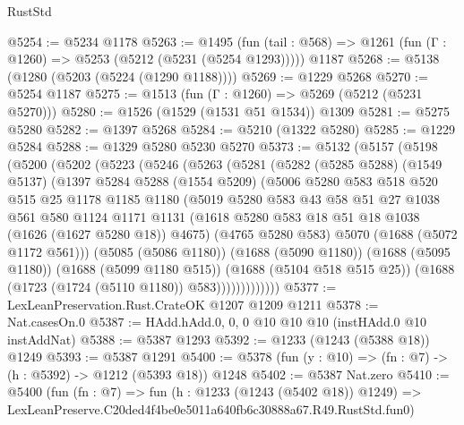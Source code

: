 \begin{lexlean}{RustStd}
\begin{coremodule}
@5254 := @5234 @1178
@5263 := @1495
    (fun (tail : @568) => @1261 (fun (Γ : @1260) => @5253 (@5212 (@5231 (@5254 @1293)))))
    @1187
@5268 := @5138 (@1280 (@5203 (@5224 (@1290 @1188))))
@5269 := @1229 @5268
@5270 := @5254 @1187
@5275 := @1513 (fun (Γ : @1260) => @5269 (@5212 (@5231 @5270)))
@5280 := @1526 (@1529 (@1531 @51 @1534)) @1309
@5281 := @5275 @5280
@5282 := @1397 @5268
@5284 := @5210 (@1322 @5280)
@5285 := @1229 @5284
@5288 := @1329 @5280 @5230 @5270
@5373 := @5132
    (@5157
      (@5198
        (@5200
          (@5202
            (@5223
              (@5246
                (@5263
                  (@5281
                    (@5282
                      (@5285 @5288)
                      (@1549 @5137)
                      (@1397
                        @5284
                        @5288
                        (@1554 @5209)
                        (@5006
                          @5280
                          @583
                          @518
                          @520
                          @515
                          @25
                          @1178
                          @1185
                          @1180
                          (@5019
                            @5280
                            @583
                            @43
                            @58
                            @51
                            @27
                            @1038
                            @561
                            @580
                            @1124
                            @1171
                            @1131
                            (@1618 @5280 @583 @18 @51 @18 @1038 (@1626 (@1627 @5280 @18)) @4675)
                            (@4765 @5280 @583)
                            @5070
                            (@1688 (@5072 @1172 @561)))
                          (@5085 (@5086 @1180))
                          (@1688 (@5090 @1180))
                          (@1688 (@5095 @1180))
                          (@1688 (@5099 @1180 @515))
                          (@1688 (@5104 @518 @515 @25))
                          (@1688 (@1723 (@1724 (@5110 @1180)) @583)))))))))))))
@5377 := LexLeanPreservation.Rust.CrateOK @1207 @1209 @1211
@5378 := Nat.casesOn.{0}
@5387 := HAdd.hAdd.{0, 0, 0} @10 @10 @10 (instHAdd.{0} @10 instAddNat)
@5388 := @5387 @1293
@5392 := @1233 (@1243 (@5388 @18)) @1249
@5393 := @5387 @1291
@5400 := @5378 (fun (y : @10) => (fn : @7) -> (h : @5392) -> @1212 (@5393 @18)) @1248
@5402 := @5387 Nat.zero
@5410 := @5400
    (fun (fn : @7) =>
    fun (h : @1233 (@1243 (@5402 @18)) @1249) =>
    LexLeanPreserve.C20ded4f4be0e5011a640fb6c30888a67.R49.RustStd.fun0)

\end{coremodule}
\end{lexlean}
